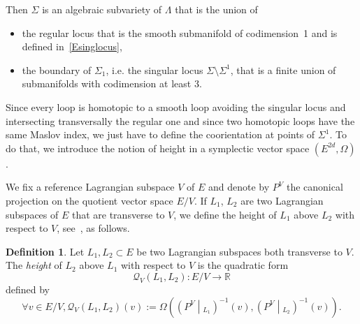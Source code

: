 \documentclass[10pt,a4paper]{amsart}
\numberwithin{equation}{section}
\newcommand*\cq{\mathcal{Q}}
\newcommand*\R{\mathbb{R}}
\let\oldforall\forall
\renewcommand*{\forall}{\mathrel{\oldforall}}
\theoremstyle{definition}
\newtheorem{defi}[theo]{Definition}
\theoremstyle{remark}
\begin{document}
Then $\Sigma$ is an algebraic subvariety of $\Lambda$ that is the union of
\begin{itemize}
\item the regular locus that is the smooth submanifold of codimension~1 and is defined in~\eqref{Esinglocus},
\item the boundary of $\Sigma_1$, i.e. the singular locus $\Sigma\setminus\Sigma^1$, that is a finite union of submanifolds with codimension at least 3.
\end{itemize}
Since every loop is homotopic to a smooth loop avoiding the singular locus and intersecting transversally the regular one and since two homotopic loops have the same Maslov index, we just have to define the coorientation at points of $\Sigma^1$. To do that, we introduce the notion of height in a symplectic vector space $(E^{2d}, \Omega)$.

We fix a reference Lagrangian subspace $V$ of $E$ and denote by $P^V$ the canonical projection on the quotient vector space $E/V$. If $L_1$, $L_2$ are two Lagrangian subspaces of $E$ that are transverse to $V$, we define the height of $L_1$ above $L_2$ with respect to $V$, see~\cite{Arn08}, as follows.

\begin{defi}
Let $L_1,L_2\subset E$ be two Lagrangian subspaces both transverse to $V$. The \emph{height} of $L_2$ above $L_1$ with respect to $V$ is the quadratic form
\[
\cq_V(L_1,L_2):E/V\to\R
\]
defined by
\[
\forall v\in E/V, \cq_V(L_1,L_2)(v):=\Omega\left(\left({P}^V\middle|_{L_1}\right)^{-1}(v),\left({P}^V\middle|_{L_2}\right)^{-1}(v)\right).
\]
\end{defi}
\end{document}
